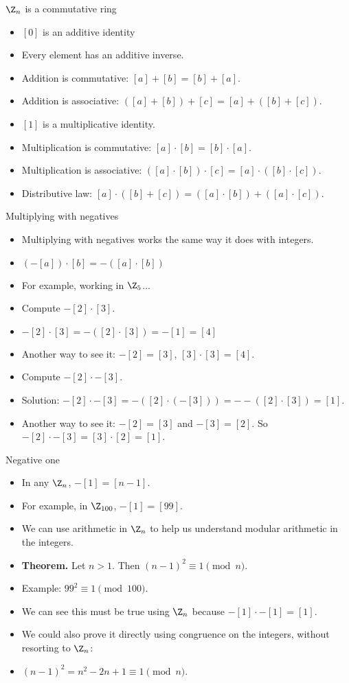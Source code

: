 \documentclass{beamer}
\begin{document}
\begin{frame}{$\Z_n$ is a commutative ring}
\begin{itemize}
  \item $[0]$ is an additive identity
  \item Every element has an additive inverse.
  \item Addition is commutative: $[a]+[b]=[b]+[a]$.
  \item Addition is associative: $([a]+[b])+[c]=[a]+([b]+[c])$.
  \item $[1]$ is a multiplicative identity.
  \item Multiplication is commutative: $[a]\cdot[b]=[b]\cdot[a]$.
  \item Multiplication is associative: $([a]\cdot[b])\cdot[c]=[a]\cdot([b]\cdot[c])$.
  \item Distributive law: $[a]\cdot([b]+[c]) = ([a]\cdot[b])+([a]\cdot [c])$.
\end{itemize}
\end{frame}

\begin{frame}{Multiplying with negatives}
\begin{itemize}
  \item Multiplying with negatives works the same way it does with integers.
  \item $(-[a])\cdot [b] = -([a]\cdot [b])$
  \item For example, working in $\Z_5$...
  \item Compute $-[2] \cdot [3]$.
  \item $-[2] \cdot [3] = -([2]\cdot[3]) = -[1] = [4]$
  \item Another way to see it: $-[2] = [3]$, $[3]\cdot[3] = [4]$.
  \item Compute $-[2]\cdot-[3]$.
  \item Solution: $-[2]\cdot-[3] = -([2]\cdot (-[3])) = --([2]\cdot[3]) = [1]$.
  \item Another way to see it: $-[2] = [3]$ and $-[3]=[2]$. So $-[2]\cdot-[3] = [3]\cdot[2] = [1]$.
\end{itemize}
\end{frame}

\begin{frame}{Negative one}
\begin{itemize}
  \item In any $\Z_n$, $-[1] = [n-1]$.
  \item For example, in $\Z_{100}$, $-[1] = [99]$.
  \item We can use arithmetic in $\Z_n$ to help us understand modular arithmetic in the integers.
  \item \textbf{Theorem.} Let $n>1$. Then $(n-1)^2 \equiv 1 \pmod n$.
  \item Example: $99^2 \equiv 1 \pmod {100}$.
  \item We can see this must be true using $\Z_n$ because $-[1]\cdot-[1] = [1]$.
  \item We could also prove it directly using congruence on the integers, without resorting to $\Z_n$:
  \item $(n-1)^2 = n^2 -2n + 1 \equiv 1 \pmod n$.
\end{itemize}
\end{frame}
\end{document}
